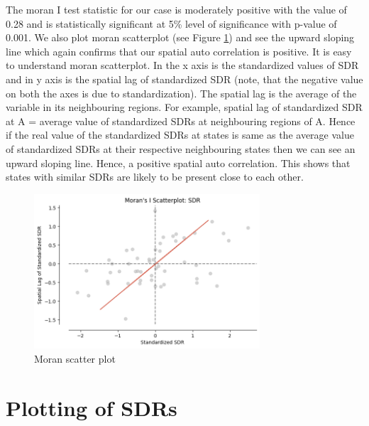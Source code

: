 \documentclass[enabledeprecatedfontcommands,parskip=half,twoside=semi,BCOR=0mm]{scrreprt}
\numberwithin{equation}{chapter}
\theoremstyle{definition}
\theoremstyle{remark}
\begin{document}
    The moran I test statistic for our case is moderately positive with the value of 0.28 and is statistically significant at 5\% level of significance with p-value of 0.001. We also plot moran scatterplot (see Figure \ref{fig:Figure 1}) and see the upward sloping line which again confirms that our spatial auto correlation is positive. It is easy to understand moran scatterplot. In the x axis is the standardized values of SDR and in y axis is the spatial lag of standardized SDR (note, that the negative value on both the axes is due to standardization). The spatial lag is the average of the variable in its neighbouring regions. For example, spatial lag of standardized SDR at A = average value of standardized SDRs at neighbouring regions of A. Hence if the real value of the standardized SDRs at states is same as the average value of standardized SDRs at their respective neighbouring states then we can see an upward sloping line. Hence, a positive spatial auto correlation. This shows that states with similar SDRs are likely to be present close to each other.
    \begin{figure}[h]
    \centering
    \includegraphics[width=0.75\textwidth]{Moran_I.png}
    \caption{Moran scatter plot}
    \label{fig:Figure 1}
    \end{figure}
    
    \section{Plotting of SDRs}
    
\end{document}

